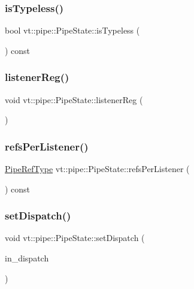 \subsubsection{\texorpdfstring{is\+Typeless()}{isTypeless()}}
{\footnotesize\ttfamily bool vt\+::pipe\+::\+Pipe\+State\+::is\+Typeless (\begin{DoxyParamCaption}{ }\end{DoxyParamCaption}) const}

\mbox{\label{structvt_1_1pipe_1_1_pipe_state_acfbe1dc3cac73153543a394b4f8add35}} 
\subsubsection{\texorpdfstring{listener\+Reg()}{listenerReg()}}
{\footnotesize\ttfamily void vt\+::pipe\+::\+Pipe\+State\+::listener\+Reg (\begin{DoxyParamCaption}{ }\end{DoxyParamCaption})}

\mbox{\label{structvt_1_1pipe_1_1_pipe_state_ad7ec2850c900f8359affd00af6d7e0cc}} 
\subsubsection{\texorpdfstring{refs\+Per\+Listener()}{refsPerListener()}}
{\footnotesize\ttfamily \hyperlink{namespacevt_ace18d74dd489d9ea506d38789fffce34}{Pipe\+Ref\+Type} vt\+::pipe\+::\+Pipe\+State\+::refs\+Per\+Listener (\begin{DoxyParamCaption}{ }\end{DoxyParamCaption}) const}

\mbox{\label{structvt_1_1pipe_1_1_pipe_state_a436083ce72366f0bece034065bb3aca1}} 
\subsubsection{\texorpdfstring{set\+Dispatch()}{setDispatch()}}
{\footnotesize\ttfamily void vt\+::pipe\+::\+Pipe\+State\+::set\+Dispatch (\begin{DoxyParamCaption}\item[{\hyperlink{structvt_1_1pipe_1_1_pipe_state_aa6d3f6b8d9c1a4d1f261bc563ff99e3e}{Dispatch\+Func\+Type}}]{in\+\_\+dispatch }\end{DoxyParamCaption})}

